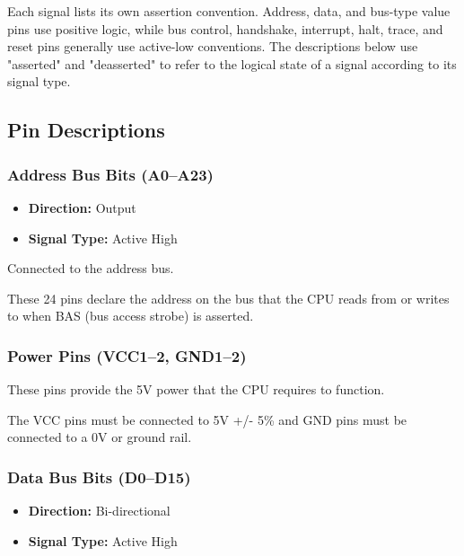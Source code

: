 Each signal lists its own assertion convention. Address, data, and bus-type value pins use positive logic, while bus
control, handshake, interrupt, halt, trace, and reset pins generally use active-low conventions. The descriptions below
use "asserted" and "deasserted" to refer to the logical state of a signal according to its signal type.

\subsection{Pin Descriptions}

\subsubsection{Address Bus Bits (A0--A23)}

\begin{itemize}
	\item \textbf{Direction:} Output
	\item \textbf{Signal Type:} Active High
\end{itemize}

Connected to the address bus.

These 24 pins declare the address on the bus that the CPU reads from or writes to when BAS (bus access strobe) is
asserted.

\subsubsection{Power Pins (VCC1--2, GND1--2)}

These pins provide the 5V power that the CPU requires to function.

The VCC pins must be connected to 5V +/- 5\% and GND pins must be connected to a 0V or ground rail.


\subsubsection{Data Bus Bits (D0--D15)}

\begin{itemize}
	\item \textbf{Direction:} Bi-directional
	\item \textbf{Signal Type:} Active High
\end{itemize}

